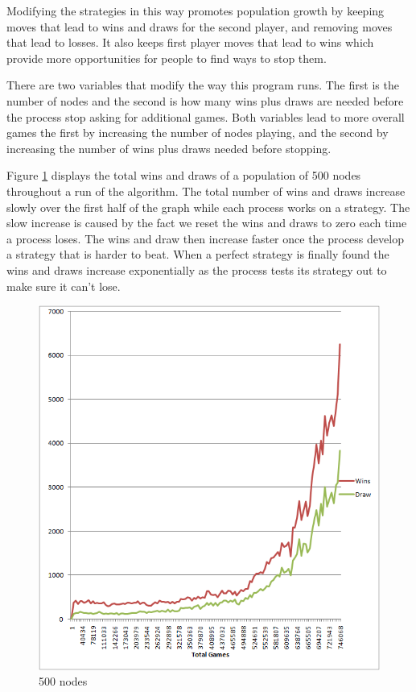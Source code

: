 \documentclass[11pt,twocolumn]{article}
\begin{document}
Modifying the strategies in this way promotes population growth by keeping moves that lead to wins and draws for the second player, and removing moves that lead to losses.  It also keeps first player moves that lead to wins which provide more opportunities for people to find ways to stop them.  

There are two variables that modify the way this program runs.  The first is the number of nodes and the second is how many wins plus draws are needed before the process stop asking for additional games.  Both variables lead to more overall games the first by increasing the number of nodes playing, and the second by increasing the number of wins plus draws needed before stopping.

Figure \ref{fig:500nodes_windraw} displays the total wins and draws of a population of 500 nodes throughout a run of the algorithm.  The total number of wins and draws increase slowly over the first half of the graph while each process works on a strategy.  The slow increase is caused by the fact we reset the wins and draws to zero each time a process loses.  The wins and draw then increase faster once the process develop a strategy that is harder to beat.  When a perfect strategy is finally found the wins and draws increase exponentially as the process tests its strategy out to make sure it can't lose.

\begin{figure}[h]
\centering\includegraphics[keepaspectratio=true,scale=0.85]{500nodes_winsdrawpergames.png}

\caption{500 nodes}
\label{fig:500nodes_windraw}
\end{figure}
\end{document}
